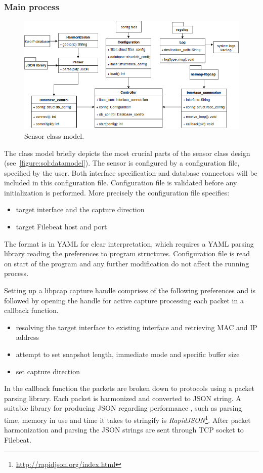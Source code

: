 \documentclass[12pt,a4paper,twoside]{report}
\begin{document}
			\subsubsection*{Main process} \label{solution:design:process}
				\begin{figure}[h]
					\centering
					\includegraphics[scale=0.57]{datamodel}
					\caption{Sensor class model.}
					\label{figure:sol:datamodel}
				\end{figure}
				The class model briefly depicts the most crucial parts of the sensor class design (see~\autoref{figure:sol:datamodel}). The sensor is configured by a configuration file, specified by the user. Both interface specification and database connectors will be included in this configuration file. Configuration file is validated before any initialization is performed. More precisely the configuration file specifies:
				\begin{itemize}[noitemsep]
					\item target interface and the capture direction
					\item target Filebeat host and port
				\end{itemize}\par
				The format is in YAML for clear interpretation, which requires a YAML parsing library reading the preferences to program structures. Configuration file is read on start of the program and any further modification do not affect the running process.\par
				Setting up a libpcap capture handle comprises of the following preferences and is followed by opening the handle for active capture processing each packet in a callback function.\par
				\begin{itemize}[noitemsep]
					\item resolving the target interface to existing interface and retrieving MAC and IP address
					\item attempt to set snapshot length, immediate mode and specific buffer size
					\item set capture direction
				\end{itemize}\par
				In the callback function the packets are broken down to protocols using a packet parsing library. Each packet is harmonized and converted to JSON string. A suitable library for producing JSON regarding performance \cite{git:benchmark:json}, such as parsing time, memory in use and time it takes to stringify is \emph{RapidJSON}\footnote{\url{http://rapidjson.org/index.html}}. After packet harmonization and parsing the JSON strings are sent through TCP socket to Filebeat.
\end{document}
